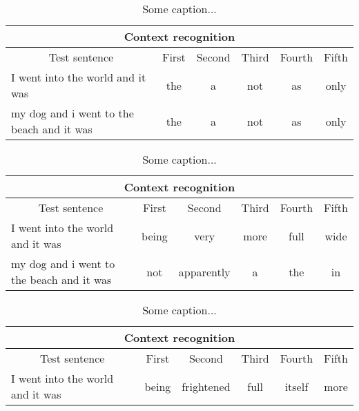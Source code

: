 \vspace{-1cm}
\begin{table}[H]
\centering
\caption{Some caption...}
{\scriptsize
\begin{tabular}{ |p{}|c|c|c|c|c| }
	\hline
	\multicolumn{6}{|c|}{Context recognition} \\
	\hline
	\multicolumn{1}{|c|}{Test sentence} & First & Second & Third & Fourth & Fifth\\
	\hline
	I went into the world and it was & the & a & not & as & only \\
	\hline
	my dog and i went to the beach and it was & the & a & not & as & only \\
	\hline
\end{tabular}
}
\end{table}

\vspace{-1cm}
\begin{table}[H]
\centering
\caption{Some caption...}
{\scriptsize
\begin{tabular}{ |p{}|c|c|c|c|c| }
	\hline
	\multicolumn{6}{|c|}{Context recognition} \\
	\hline
	\multicolumn{1}{|c|}{Test sentence} & First & Second & Third & Fourth & Fifth\\
	\hline
	I went into the world and it was & being & very & more & full & wide \\
	\hline
	my dog and i went to the beach and it was & not & apparently & a & the & in \\
	\hline
\end{tabular}
}
\end{table}

\vspace{-1cm}
\begin{table}[H]
\centering
\caption{Some caption...}
{\scriptsize
\begin{tabular}{ |p{}|c|c|c|c|c| }
	\hline
	\multicolumn{6}{|c|}{Context recognition} \\
	\hline
	\multicolumn{1}{|c|}{Test sentence} & First & Second & Third & Fourth & Fifth\\
	\hline
	I went into the world and it was & being & frightened & full & itself & more \\
	\hline
\end{tabular}
}
\end{table}